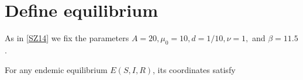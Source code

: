 \documentclass[letterpaper,10pt,english]{jupyterBook}
\begin{document}
\begin{sphinxVerbatim}[commandchars=\\\{\}]
\end{sphinxVerbatim}


\section{Define equilibrium}
\label{\detokenize{SIRmodel:define-equilibrium}}
\sphinxAtStartPar
As in {[}\hyperlink{cite.references:id20}{SZ14}{]} we fix the parameters \(A = 20, \mu_0 = 10, d = 1/10, \nu = 1,\)
and \(\beta = 11.5\).

\begin{sphinxVerbatim}[commandchars=\\\{\}]
\end{sphinxVerbatim}

\sphinxAtStartPar
For any endemic equilibrium \(E(S, I, R)\), its coordinates satisfy

\begin{sphinxVerbatim}[commandchars=\\\{\}]
\end{sphinxVerbatim}
\end{document}
